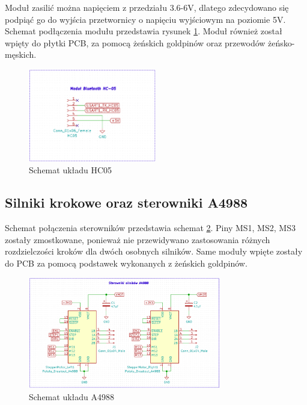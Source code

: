 Moduł zasilić można napięciem z przedziału 3.6-6V, dlatego zdecydowano się podpiąć go do wyjścia przetwornicy o napięciu wyjściowym na poziomie 5V. Schemat podłączenia modułu przedstawia rysunek \ref{HC05 schemat}. Moduł również został wpięty do płytki PCB, za pomocą żeńskich goldpinów oraz przewodów żeńsko-męskich.

\begin{figure}[h!]
    \centering
    \includegraphics[width=0.5\textwidth]{Rysunki/Rozdzial05/HC05_schemat.png}
    \caption{Schemat układu HC05}
    \label{HC05 schemat}
\end{figure}

\subsection{Silniki krokowe oraz sterowniki A4988}

Schemat połączenia sterowników przedstawia schemat \ref{A4988 schemat}. Piny MS1, MS2, MS3 zostały zmostkowane, ponieważ nie przewidywano zastosowania różnych rozdzielczości kroków dla dwóch osobnych silników. Same moduły wpięte zostały do PCB za pomocą podstawek wykonanych z żeńskich goldpinów.

\begin{figure}[h!]
    \centering
    \includegraphics[width=0.75\textwidth]{Rysunki/Rozdzial05/A4988_schemat.png}
    \caption{Schemat układu A4988}
    \label{A4988 schemat}
\end{figure}

